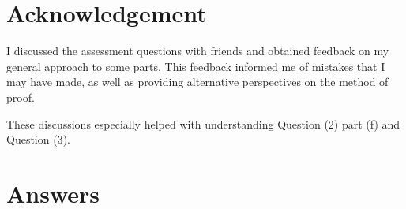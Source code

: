 
\maketitle
\newpage

\section*{Acknowledgement}

I discussed the assessment questions with friends and obtained feedback on my general approach to some parts.
This feedback informed me of mistakes that I may have made, as well as providing alternative perspectives on the method of proof.

These discussions especially helped with understanding Question (2) part (f) and Question (3).

\section*{Answers}

